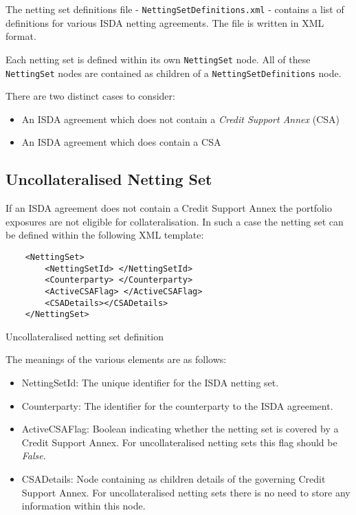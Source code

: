 The netting set definitions file - {\tt NettingSetDefinitions.xml} - 
contains a list of
definitions for various ISDA netting agreements. The file is written
in XML format. 

\vspace{1em}

Each netting set is defined within its own \lstinline!NettingSet!
node. All of these \lstinline!NettingSet! nodes are contained as
children of a \lstinline!NettingSetDefinitions! node.

\vspace{1em}

There are two distinct cases to consider:

\begin{itemize}
\item An ISDA agreement which does not contain a \emph{Credit Support
    Annex} (CSA)
\item An ISDA agreement which does contain a CSA
\end{itemize}
\subsection{Uncollateralised Netting Set}
If an ISDA agreement does not contain a Credit Support Annex the
portfolio exposures are not eligible for collateralisation. In such a
case the netting set can be defined within the following XML template:

\begin{listing}[H]
\begin{verbatim}
    <NettingSet>
        <NettingSetId> </NettingSetId>
        <Counterparty> </Counterparty>
        <ActiveCSAFlag> </ActiveCSAFlag>
        <CSADetails></CSADetails>
    </NettingSet>
\end{verbatim}
\caption{Uncollateralised netting set definition}
\label{lst:nettingSetUncollat}
\end{listing}

The meanings of the various elements are as follows:
\begin{itemize}
\item NettingSetId: The unique identifier for the ISDA netting set.
\item Counterparty: The identifier for the counterparty to the ISDA agreement.
\item ActiveCSAFlag: Boolean indicating whether the netting set is
  covered by a Credit Support Annex. For uncollateralised netting sets
  this flag should be \emph{False}.
\item CSADetails: Node containing as children details of the governing
  Credit Support Annex. For uncollateralised netting sets there is no
  need to store any information within this node.
\end{itemize}
